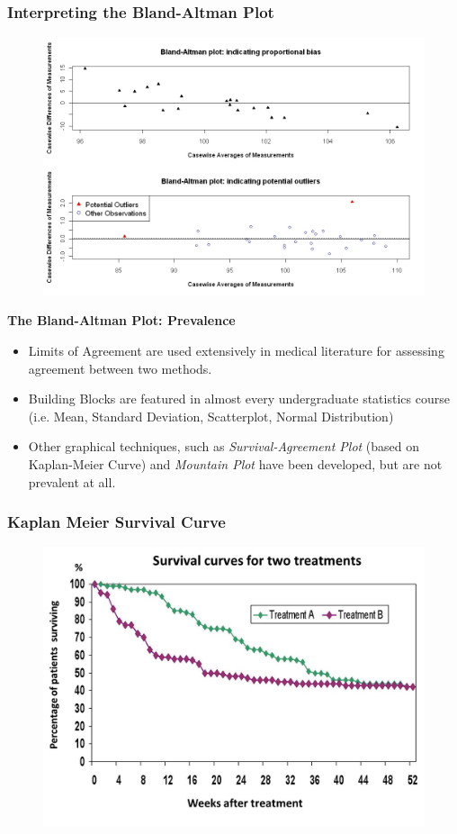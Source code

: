 \documentclass[compress]{beamer}        %
\makeatletter
\newcommand{\tcb}{\textcolor{beamer@blendedblue}}
\makeatother
\begin{document}
\begin{frame}
	\frametitle{Interpreting the Bland-Altman Plot}
	\begin{figure}
		\centering
		\includegraphics[width=0.9\linewidth]{BAcombi}
		\caption{}
		\label{fig:BAcombi}
	\end{figure}
	
\end{frame}
\begin{frame}{\bf \tcb{The Bland-Altman Plot: Prevalence}}
\large
\begin{itemize}\itemsep0.7cm

\item Limits of Agreement are used extensively in medical literature for assessing agreement between two methods.
\item Building Blocks are featured in almost every undergraduate statistics course (i.e. Mean, Standard Deviation, Scatterplot, Normal Distribution)
\item Other graphical techniques, such as \textit{Survival-Agreement Plot} (based on Kaplan-Meier Curve) and \textit{Mountain Plot} have been developed, but are not prevalent at all.
\end{itemize}
\end{frame}

\begin{frame}
	\frametitle{Kaplan Meier Survival Curve}
	\begin{figure}
\centering
\includegraphics[width=0.7\linewidth]{kaplanmeier}
\end{figure}

\end{frame}
\end{document}
